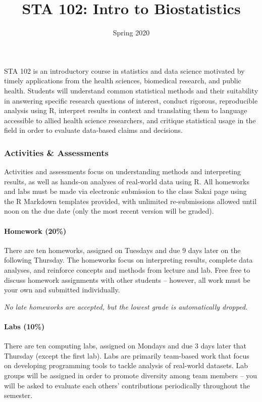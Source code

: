 \documentclass[
]{article}
\title{STA 102: Intro to Biostatistics}
\author{Spring 2020}
\date{}
\begin{document}
\maketitle

STA 102 is an introductory course in statistics and data science
motivated by timely applications from the health sciences, biomedical
research, and public health. Students will understand common statistical
methods and their suitability in answering specific research questions
of interest, conduct rigorous, reproducible analysis using R, interpret
results in context and translating them to language accessible to allied
health science researchers, and critique statistical usage in the field
in order to evaluate data-based claims and decisions.

\hypertarget{activities-assessments}{%
\subsubsection{Activities \& Assessments}\label{activities-assessments}}

Activities and assessments focus on understanding methods and
interpreting results, as well as hands-on analyses of real-world data
using R. All homeworks and labs must be made via electronic submission
to the class Sakai page using the R Markdown templates provided, with
unlimited re-submissions allowed until noon on the due date (only the
most recent version will be graded).

\hypertarget{homework-20}{%
\paragraph{Homework (20\%)}\label{homework-20}}

There are ten homeworks, assigned on Tuesdays and due 9 days later on
the following Thursday. The homeworks focus on interpreting results,
complete data analyses, and reinforce concepts and methods from lecture
and lab. Free free to discuss homework assignments with other students
-- however, all work must be your own and submitted individually.

\emph{No late homeworks are accepted, but the lowest grade is
automatically dropped.}

\hypertarget{labs-10}{%
\paragraph{Labs (10\%)}\label{labs-10}}

There are ten computing labs, assigned on Mondays and due 3 days later
that Thursday (except the first lab). Labs are primarily team-based work
that focus on developing programming tools to tackle analysis of
real-world datasets. Lab groups will be assigned in order to promote
diversity among team members -- you will be asked to evaluate each
others' contributions periodically throughout the semester.
\end{document}
